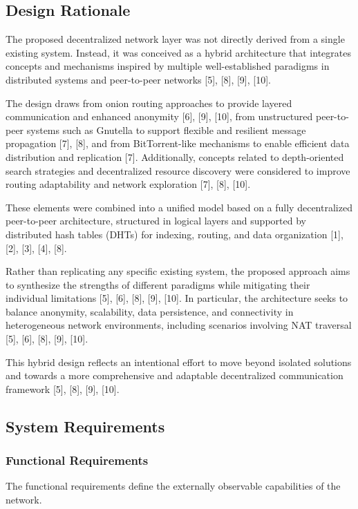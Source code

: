 \documentclass[12pt]{article}
\begin{document}
\subsection{Design Rationale}

The proposed decentralized network layer was not directly derived from a single existing system. Instead, it was conceived as a hybrid architecture that integrates concepts and mechanisms inspired by multiple well-established paradigms in distributed systems and peer-to-peer networks [5], [8], [9], [10].

The design draws from onion routing approaches to provide layered communication and enhanced anonymity [6], [9], [10], from unstructured peer-to-peer systems such as Gnutella to support flexible and resilient message propagation [7], [8], and from BitTorrent-like mechanisms to enable efficient data distribution and replication [7]. Additionally, concepts related to depth-oriented search strategies and decentralized resource discovery were considered to improve routing adaptability and network exploration [7], [8], [10].

These elements were combined into a unified model based on a fully decentralized peer-to-peer architecture, structured in logical layers and supported by distributed hash tables (DHTs) for indexing, routing, and data organization [1], [2], [3], [4], [8].

Rather than replicating any specific existing system, the proposed approach aims to synthesize the strengths of different paradigms while mitigating their individual limitations [5], [6], [8], [9], [10]. In particular, the architecture seeks to balance anonymity, scalability, data persistence, and connectivity in heterogeneous network environments, including scenarios involving NAT traversal [5], [6], [8], [9], [10].

This hybrid design reflects an intentional effort to move beyond isolated solutions and towards a more comprehensive and adaptable decentralized communication framework [5], [8], [9], [10].

\subsection{System Requirements}
\subsubsection{Functional Requirements}

The functional requirements define the externally observable capabilities of the network.
\end{document}

